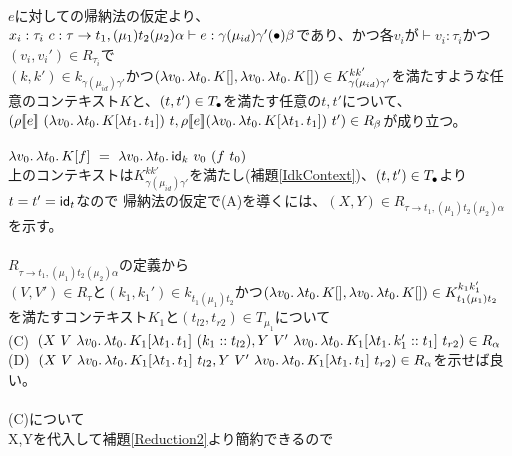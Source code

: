 \\
$e$に対しての帰納法の仮定より、\\
$x_i:\tau_i\ c:\tau \rightarrow t_1, (\mu_1) t_2 (\mu_2) \alpha \vdash e : \gamma (\mu_{id}) \gamma' (\bullet) \beta$であり、かつ各$v_i$が$\vdash v_i:\tau_i$かつ$(v_i,v_i') \in R_{\tau_i}$で\\
$(k,k')\in k_{\gamma (\mu_{id}) \gamma'}$かつ$(\lambda{v_0}.\,{\lambda{t_0}.\,{K[]}}, \lambda{v_0}.\,{\lambda{t_0}.\,{K[]}})\in  K^{kk'}_{\gamma (\mu_{id}) \gamma'}$を満たすような任意のコンテキスト$K$と、$(t, t') \in T_{\bullet}$を満たす任意の$t, t'$について、\\
$(\rho \CPSTh{e}\ \LamP{v_0}{\Lam{t_0}{K[\Lam{t_1}{t_1}]}}\ t, \rho \CPSTh{e} \LamP{v_0}{\Lam{t_0}{K[\Lam{t_1}{t_1}]}}\ t')\in R_{\beta}$が成り立つ。\\
\\
$\Lam{v_0}{\Lam{t_0}{K[f]}}\ =\ \Lam{v_0}{\Lam{t_0}{\Idk\ v_0\ (f\ t_0)}}$\\
上のコンテキストは$K^{kk'}_{\gamma (\mu_{id}) \gamma'}$を満たし(補題\ref{IdkContext})、$(t, t') \in T_{\bullet}$より$t=t'=\textsf{id}_t$なので
帰納法の仮定で(A)を導くには、$(X,Y)\in R_{\tau \rightarrow t_1, (\mu_1) t_2 (\mu_2) \alpha}$を示す。\\
\\
$R_{\tau \rightarrow t_1, (\mu_1) t_2 (\mu_2) \alpha}$の定義から\\
$(V,V')\in R_{\tau}$と$(k_1,k_1')\in k_{t_1 (\mu_1) t_2}$かつ$(\lambda{v_0}.\,{\lambda{t_0}.\,{K[]}}, \lambda{v_0}.\,{\lambda{t_0}.\,{K[]}})\in K^{k_1k_1'}_{t_1 (\mu_1) t_2}$を満たすコンテキスト$K_1$と$(t_{l2},t_{r2})\in T_{\mu_1}$について\\
(C)\ $(X\ V\ \Lam{v_0}{\Lam{t_0}{K_1[\Lam{t_1}{t_1}]}}\ \ConsP{k_1}{t_{l2}},Y\ V'\ \Lam{v_0}{\Lam{t_0}{K_1[\Lam{t_1}{\Cons{k_1'}{t_1}}]}}\ t_{r2})\in R_{\alpha}$\\
(D)\ $(X\ V\ \Lam{v_0}{\Lam{t_0}{K_1[\Lam{t_1}{t_1}]}}\ t_{l2},Y\ V'\ \Lam{v_0}{\Lam{t_0}{K_1[\Lam{t_1}{t_1}]}}\ t_{r2})\in R_{\alpha}$を示せば良い。\\
\\
(C)について\\
X,Yを代入して補題\ref{Reduction2}より簡約できるので\\
